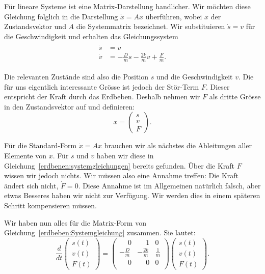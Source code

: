 Für lineare Systeme ist eine Matrix-Darstellung handlicher.
Wir möchten diese Gleichung folglich in die Darstellung $\dot x = Ax$ überführen,
wobei $x$ der Zustandsvektor und $A$ die Systemmatrix bezeichnet.
Wir substituieren $\dot s = v$ für die Geschwindigkeit und erhalten das Gleichungssystem
\begin{align}
  \begin{split}
    \dot s &= v \\ 
    \dot v &= -\frac{D}{m} {s} -\frac{2k}{m} {v} + \frac{F} {m}.
  \end{split}
  \label{erdbenen:systemgleichungen}
\end{align}

Die relevanten Zustände sind also die Position $s$ und die Geschwindigkeit $v$.
Die für uns eigentlich interessante Grösse ist jedoch der Stör-Term $F$.
Dieser entspricht der Kraft durch das Erdbeben.
Deshalb nehmen wir $F$ als dritte Grösse in den Zustandsvektor auf und definieren:
\[ 
  x = \begin{pmatrix} s \\ v \\ F \end{pmatrix}.
\] 
  
Für die Standard-Form $\dot x = Ax$ brauchen wir als nächstes die Ableitungen aller Elemente von $x$.
Für $s$ und $v$  haben wir diese in Gleichung~\eqref{erdbenen:systemgleichungen} bereits gefunden.
Über die Kraft $F$ wissen wir jedoch nichts.
Wir müssen also eine Annahme treffen: Die Kraft ändert sich nicht, $\dot F = 0$.
Diese Annahme ist im Allgemeinen natürlich falsch, aber etwas Besseres haben wir nicht zur Verfügung.
Wir werden dies in einem späteren Schritt kompensieren müssen.

Wir haben nun alles für die Matrix-Form von Gleichung~\eqref{erdbeben:Systemgleichung} zusammen.
Sie lautet:
\begin{equation}
  \frac{d}{dt} \begin{pmatrix} s(t) \\ v(t) \\ F(t) \end{pmatrix}
  =
 \begin{pmatrix}
  \phantom- 0 & \phantom-1& 0 \\ 
  - \frac{D}{m} &-\frac{2k}{m} & \frac{1} {m} \\
  \phantom-0 & \phantom-0 & 0\\
  \end{pmatrix}
  \begin{pmatrix} s(t) \\ v(t) \\ F(t) \end{pmatrix}.
  \label{erdbeben:systemmatrix}
\end{equation}

